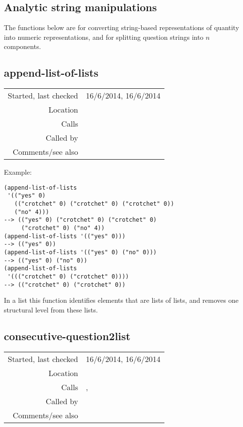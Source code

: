 \subsection{Analytic string manipulations}\label{sec:analytic-string-manipulations}

The functions below are for converting
string-based representations of quantity into
numeric representations, and for splitting question
strings into $n$ components.


\subsection*{append-list-of-lists}\label{fun:append-list-of-lists}

\vspace{0.3cm}
\begin{tabular}{r|p{8cm}}
Started, last checked & 16/6/2014, 16/6/2014 \\
Location & \nameref{sec:analytic-string-manipulations} \\
Calls & \\
Called by & \nameref{fun:followed-by-splitter} \\
Comments/see also & \nameref{fun:append-list}
\end{tabular}

\vspace{0.5cm}
\noindent Example:
\begin{verbatim}
(append-list-of-lists
 '(("yes" 0)
   (("crotchet" 0) ("crotchet" 0) ("crotchet" 0))
   ("no" 4)))
--> (("yes" 0) ("crotchet" 0) ("crotchet" 0)
     ("crotchet" 0) ("no" 4))
(append-list-of-lists '(("yes" 0)))
--> (("yes" 0))
(append-list-of-lists '(("yes" 0) ("no" 0)))
--> (("yes" 0) ("no" 0))
(append-list-of-lists 
 '((("crotchet" 0) ("crotchet" 0))))
--> (("crotchet" 0) ("crotchet" 0))
\end{verbatim}

\noindent In a list this function identifies elements
that are lists of lists, and removes one structural
level from these lists.


\subsection*{consecutive-question2list}\label{fun:consecutive-question2list}

\vspace{0.3cm}
\begin{tabular}{r|p{8cm}}
Started, last checked & 16/6/2014, 16/6/2014 \\
Location & \nameref{sec:analytic-string-manipulations} \\
Calls & \nameref{fun:number-string2numberless-string},\newline \nameref{fun:number-string2numeric} \\
Called by & \nameref{fun:followed-by-splitter} \\
Comments/see also &
\end{tabular}

